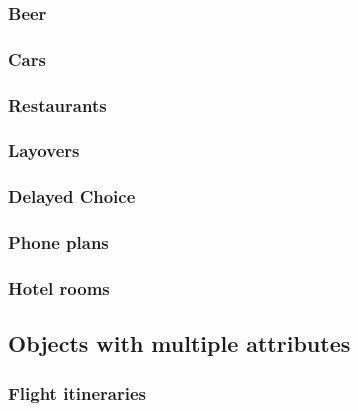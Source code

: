 \documentclass[11pt,letter]{article}
\begin{document}
\subsubsection{Beer}



\subsubsection{Cars}



\subsubsection{Restaurants}



\subsubsection{Layovers}



\subsubsection{Delayed Choice}



\subsubsection{Phone plans}



\subsubsection{Hotel rooms}



\subsection{Objects with multiple attributes}

\subsubsection{Flight itineraries}


\end{document}
